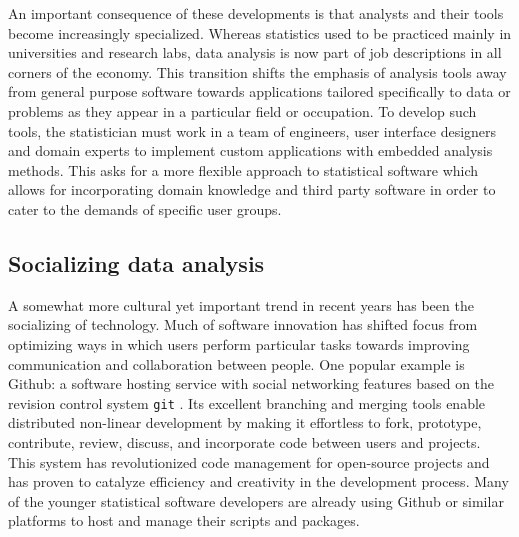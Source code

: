 An important consequence of these developments is that analysts and their tools become increasingly specialized. Whereas statistics used to be practiced mainly in universities and research labs, data analysis is now part of job descriptions in all corners of the economy. This transition shifts the emphasis of analysis tools away from general purpose software towards applications tailored specifically to data or problems as they appear in a particular field or occupation. To develop such tools, the statistician must work in a team of engineers, user interface designers and domain experts to implement custom applications with embedded analysis methods. This asks for a more flexible approach to statistical software which allows for incorporating domain knowledge and third party software in order to cater to the demands of specific user groups. 
 


\subsection{Socializing data analysis}

A somewhat more cultural yet important trend in recent years has been the socializing of technology. Much of software innovation has shifted focus from optimizing ways in which users perform particular tasks towards improving communication and collaboration between people. One popular example is Github: a software hosting service with social networking features based on the revision control system \texttt{git} \citep{torvalds2010git}. Its excellent branching and merging tools enable distributed non-linear development by making it effortless to fork, prototype, contribute, review, discuss, and incorporate code between users and projects. This system has revolutionized code management for open-source projects and has proven to catalyze efficiency and creativity in the  development process. Many of the younger statistical software developers are already using Github or similar platforms to host and manage their scripts and packages. 

